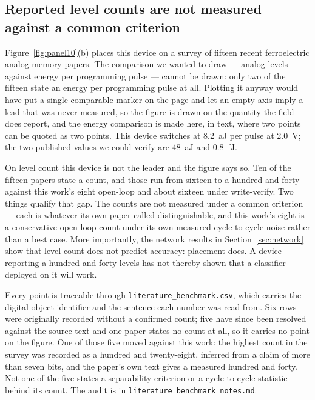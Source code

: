\subsection{Reported level counts are not measured against a common criterion}

Figure~\ref{fig:panel10}(b) places this device on a survey of fifteen recent ferroelectric
analog-memory papers. The comparison we wanted to draw --- analog levels against energy per
programming pulse --- cannot be drawn: only two of the fifteen state an energy per
programming pulse at all. Plotting it anyway would have put a single comparable marker on
the page and let an empty axis imply a lead that was never measured, so the figure is drawn
on the quantity the field does report, and the energy comparison is made here, in text,
where two points can be quoted as two points. This device switches at
\SI{8.2}{\atto\joule} per pulse at \SI{2.0}{\volt}; the two published values we could
verify are \SI{48}{\atto\joule} and \SI{0.8}{\femto\joule}.

On level count this device is not the leader and the figure says so. Ten of the fifteen
papers state a count, and those run from sixteen to a hundred and forty against this
work's eight open-loop and about sixteen under write-verify. Two things qualify that gap.
The counts are not measured under a common criterion --- each is whatever its own paper
called distinguishable, and this work's eight is a conservative open-loop count under its
own measured cycle-to-cycle noise rather than a best case. More importantly, the network
results in Section~\ref{sec:network} show that level count does not predict accuracy:
placement does. A device reporting a hundred and forty levels has not thereby shown
that a classifier deployed on it will work.

Every point is traceable through \texttt{literature\_benchmark.csv}, which carries the
digital object identifier and the sentence each number was read from. Six rows were
originally recorded without a confirmed count; five have since been resolved against the
source text and one paper states no count at all, so it carries no point on the figure.
One of those five moved against this work: the highest count in the survey was recorded as
a hundred and twenty-eight, inferred from a claim of more than seven bits, and the paper's
own text gives a measured hundred and forty. Not one of the five states a separability
criterion or a cycle-to-cycle statistic behind its count. The audit is in
\texttt{literature\_benchmark\_notes.md}.
